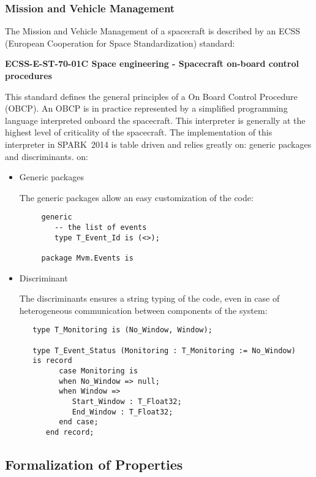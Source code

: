 \documentclass[10pt,a4paper,twocolumn]{article}
\newcommand{\newspark}{SPARK~2014\xspace}
\begin{document}
\subsubsection{Mission and Vehicle Management}

The Mission and Vehicle Management of a spacecraft is described by an ECSS (European Cooperation for Space Standardization) standard:

\begin{center}
{\bf ECSS-E-ST-70-01C Space engineering - Spacecraft on-board control procedures}
\end{center}

This standard defines the general principles of a On Board Control Procedure (OBCP). An OBCP is in practice represented by a simplified programming language interpreted onboard the spacecraft. This interpreter is generally at the highest level of criticality of the spacecraft. The implementation of this interpreter in \newspark is table driven and relies greatly
\ifdefined\abstractonly
on: generic packages and discriminants.
\else
on:
\begin{itemize}
\item Generic packages

	The generic packages allow an easy customization of the code:

	\begin{verbatim}
     generic
        -- the list of events
        type T_Event_Id is (<>);

     package Mvm.Events is
	\end{verbatim}

\item Discriminant

	The discriminants ensures a string typing of the code, even in case of heterogeneous communication between components of the system:

	\begin{verbatim}
   type T_Monitoring is (No_Window, Window);

   type T_Event_Status (Monitoring : T_Monitoring := No_Window)
   is record
         case Monitoring is
         when No_Window => null;
         when Window =>
            Start_Window : T_Float32;
            End_Window : T_Float32;
         end case;
      end record;
	\end{verbatim}
\end{itemize}
\fi

\subsection{Formalization of Properties}
\end{document}
